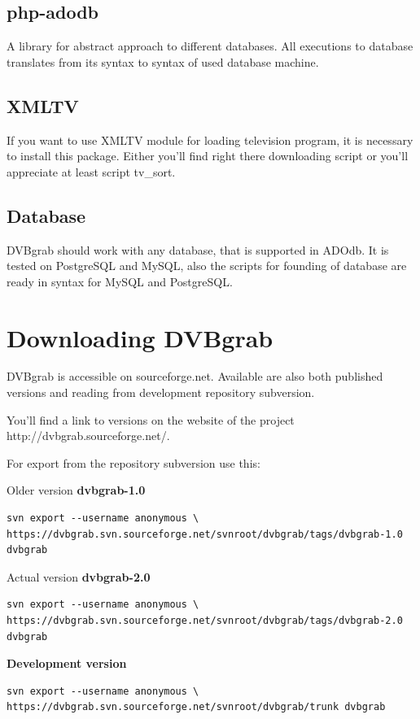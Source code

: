 \subsection{php-adodb}
A library for abstract approach to different databases. All executions to database translates from its syntax to syntax of used database machine.

\subsection{XMLTV}
If you want to use XMLTV module for loading television program, it is necessary to install this package. Either you'll find right there downloading script or you'll appreciate at least script tv\_sort.
\subsection{Database}
DVBgrab should work with any database, that is supported in ADOdb. It is tested on PostgreSQL and MySQL, also the scripts for founding of database are ready in syntax for MySQL and PostgreSQL.
\section{Downloading DVBgrab}
DVBgrab is accessible on sourceforge.net. Available are also both published versions and reading from development repository subversion.

You'll find a link to versions on the website of the project http://dvbgrab.sourceforge.net/.

For export from the repository subversion use this:

Older version \textbf{dvbgrab-1.0}
\begin{small}\begin{verbatim}
svn export --username anonymous \
https://dvbgrab.svn.sourceforge.net/svnroot/dvbgrab/tags/dvbgrab-1.0 dvbgrab
\end{verbatim}\end{small}
Actual version \textbf{dvbgrab-2.0}
\begin{small}\begin{verbatim}
svn export --username anonymous \
https://dvbgrab.svn.sourceforge.net/svnroot/dvbgrab/tags/dvbgrab-2.0 dvbgrab
\end{verbatim}\end{small}
\textbf{Development version}
\begin{small}\begin{verbatim}
svn export --username anonymous \
https://dvbgrab.svn.sourceforge.net/svnroot/dvbgrab/trunk dvbgrab
\end{verbatim}\end{small}

